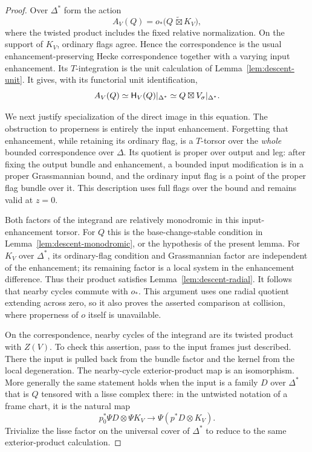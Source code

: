 \begin{proof}
Over $\Delta^*$ form the action
\[
 A_V(Q)=o_*\bigl(Q\,\widetilde\boxtimes K_V\bigr),
\]
where the twisted product includes the fixed relative normalization.
On the support of $K_V$, ordinary flags agree.  Hence the
correspondence is the usual enhancement-preserving Hecke
correspondence together with a varying input enhancement.  Its
$T$-integration is the unit calculation of
Lemma~\ref{lem:descent-unit}.  It gives, with its functorial unit
identification,
\begin{equation}\label{eq:descent-punctured-action}
 A_V(Q)\simeq \mathsf H_V(Q)|_{\Delta^*}
       \simeq Q\boxtimes V_\sigma|_{\Delta^*}.
\end{equation}

We next justify specialization of the direct image in this equation.
The obstruction to properness is entirely the input enhancement.
Forgetting that enhancement, while retaining its ordinary flag,
is a $T$-torsor over the \emph{whole} bounded correspondence over
$\Delta$.  Its quotient is proper over output and leg: after fixing
the output bundle and enhancement, a bounded input modification is
in a proper Grassmannian bound, and the ordinary input flag is a
point of the proper flag bundle over it.  This description uses full
flags over the bound and remains valid at $z=0$.

Both factors of the integrand are relatively monodromic in this
input-enhancement torsor.  For $Q$ this is the base-change-stable
condition in Lemma~\ref{lem:descent-monodromic}, or the hypothesis of
the present lemma.  For $K_V$ over $\Delta^*$, its ordinary-flag
condition and Grassmannian factor are independent of the enhancement;
its remaining factor is a local system in the enhancement difference.
Thus their product satisfies Lemma~\ref{lem:descent-radial}.
It follows that nearby cycles commute with $o_*$.  This argument
uses one radial quotient extending across zero, so it also proves
the asserted comparison at collision, where properness of $o$
itself is unavailable.

On the correspondence, nearby cycles of the integrand are its
twisted product with $Z(V)$.  To check this assertion, pass to the
input frames just described.  There the input is pulled back from
the bundle factor and the kernel from the local degeneration.
The nearby-cycle exterior-product map is an isomorphism.  More
generally the same statement holds when the input is a family $D$
over $\Delta^*$ that is $Q$ tensored with a lisse complex there:
in the untwisted notation of a frame chart, it is the natural map
\begin{equation}\label{eq:descent-tensor-exchange}
 p_0^*\Psi D\otimes\Psi K_V
       \longrightarrow \Psi(p^*D\otimes K_V).
\end{equation}
Trivialize the lisse factor on the universal cover of $\Delta^*$ to
reduce to the same exterior-product calculation.


\end{proof}
